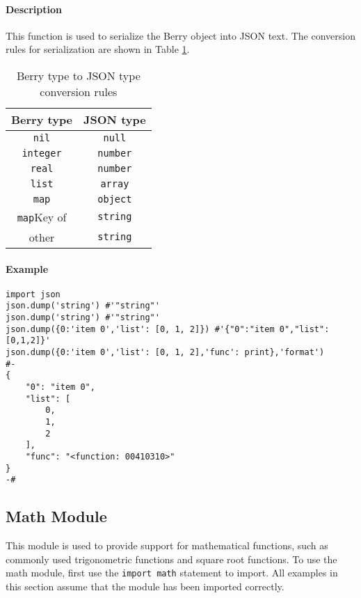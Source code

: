 \paragraph{Description}
This function is used to serialize the Berry object into JSON text. The conversion rules for serialization are shown in Table \ref{tab::berry2json_rule}.
\begin{table}[htb]
    \centering
    \setlength{\tabcolsep}{18mm}
    \begin{tabular}{cc} \toprule
        \textbf{Berry type} & \textbf{JSON type} \\ \midrule
        \texttt{nil} & \texttt{null} \\
        \texttt{integer} & \texttt{number} \\
        \texttt{real} & \texttt{number} \\
        \texttt{list} & \texttt{array} \\
        \texttt{map} & \texttt{object} \\
        \texttt{map}Key of & \texttt{string} \\
        other & \texttt{string} \\
        \bottomrule
    \end{tabular}
    \caption{Berry type to JSON type conversion rules}
    \label{tab::berry2json_rule}
\end{table}

\paragraph{Example}
\begin{lstlisting}[language=berry, numbers=none]
import json
json.dump('string') #'"string"'
json.dump('string') #'"string"'
json.dump({0:'item 0','list': [0, 1, 2]}) #'{"0":"item 0","list":[0,1,2]}'
json.dump({0:'item 0','list': [0, 1, 2],'func': print},'format')
#-
{
    "0": "item 0",
    "list": [
        0,
        1,
        2
    ],
    "func": "<function: 00410310>"
}
-#
\end{lstlisting}

\subsection {Math Module}This module is used to provide support for mathematical functions, such as commonly used trigonometric functions and square root functions. To use the math module, first use the \texttt{import math} statement to import. All examples in this section assume that the module has been imported correctly.


